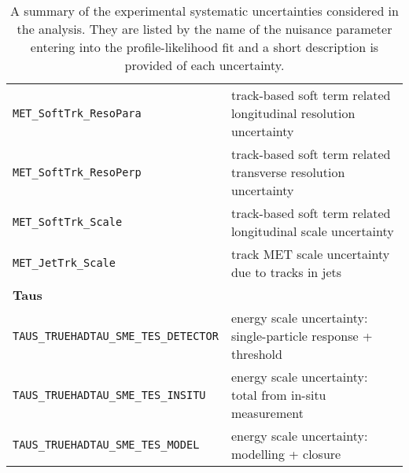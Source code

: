 \begin{table}
{\begin{tabular}{ll}
      \texttt{MET\_SoftTrk\_ResoPara} & track-based soft term related longitudinal resolution uncertainty \\
      \texttt{MET\_SoftTrk\_ResoPerp} &  track-based soft term related transverse resolution uncertainty \\
      \texttt{MET\_SoftTrk\_Scale} & track-based soft term related longitudinal scale uncertainty \\
      \texttt{MET\_JetTrk\_Scale} & track MET scale uncertainty due to tracks in jets \\
      {\bfseries Taus}&\\
      \texttt{TAUS\_TRUEHADTAU\_SME\_TES\_DETECTOR} & energy scale uncertainty: single-particle response + threshold \\
      \texttt{TAUS\_TRUEHADTAU\_SME\_TES\_INSITU} & energy scale uncertainty: total from in-situ measurement \\
      \texttt{TAUS\_TRUEHADTAU\_SME\_TES\_MODEL} & energy scale uncertainty: modelling + closure \\
      \bottomrule
    \end{tabular}
  }
  \caption{A summary of the experimental systematic uncertainties considered in
    the analysis. They are listed by the name of the nuisance parameter entering
    into the profile-likelihood fit and a short description is provided of each
    uncertainty.}
  \label{tab:expSyst}
\end{table}